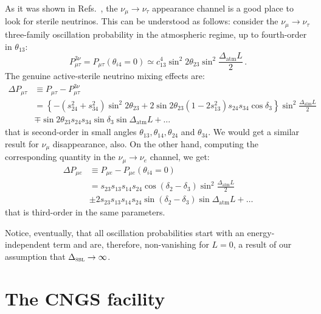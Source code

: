\documentclass[12pt]{elsart}
\newcommand{\Atm}{\text{atm}}
\newcommand{\Sbl}{\textsc{sbl}}
\begin{document}
As it was shown in Refs.~\cite{Donini:2001xy, Donini:2001xp}, the
$\nu_\mu \to \nu_\tau$ appearance channel is a good place to look for
sterile neutrinos. This can be understood as follows: consider the
$\nu_\mu \to \nu_\tau$ three-family oscillation probability in the
atmospheric regime, up to fourth-order in $\theta_{13}$:
%
\begin{equation}
    P^{3\nu}_{\mu\tau} = P_{\mu\tau} (\theta_{i4} = 0)
    \simeq c^4_{13} \sin^2 2 \theta_{23}
    \sin^2 \frac{\Delta_\Atm L}{2} \,.
\end{equation}
%
The genuine active-sterile neutrino mixing effects are:
%
\begin{equation} \begin{split}
    \Delta P_{\mu \tau} &\equiv P_{\mu \tau} - P^{3\nu}_{\mu\tau}
    \\
    &= \left\lbrace - (s^2_{24} + s^2_{34}) \sin^2 2 \theta_{23} 
    + 2 \sin 2 \theta_{23} (1 - 2 s^2_{13}) s_{24} s_{34}
    \cos\delta_3 \right\rbrace \sin^2 \frac{\Delta_\Atm L}{2}
    \\
    &\mp \sin 2 \theta_{23} s_{24} s_{34} \sin\delta_3
    \sin \Delta_\Atm L + \dots
\end{split} \end{equation}
%
that is second-order in small angles $\theta_{13}, \theta_{14},
\theta_{24}$ and $\theta_{34}$. We would get a similar result for
$\nu_\mu$ disappearance, also. On the other hand, computing the
corresponding quantity in the $\nu_\mu \to \nu_e$ channel, we get:
%
\begin{equation} \begin{split}
    \label{eq:dpmue}
    \Delta P_{\mu e} &\equiv P_{\mu e} - P_{\mu e}(\theta_{i4} = 0)
    \\
    &= s_{23} s_{13} s_{14} s_{24} \cos(\delta_2 - \delta_3)
    \sin^2 \frac{\Delta_\Atm L}{2}
    \\
    &\pm 2 s_{23} s_{13} s_{14} s_{24}
    \sin(\delta_2 - \delta_3) \sin \Delta_\Atm L + \dots
\end{split} \end{equation}
%
that is third-order in the same parameters.

Notice, eventually, that all oscillation probabilities start with an
energy-independent term and are, therefore, non-vanishing for $L=0$, a
result of our assumption that $\Delta_\Sbl \to \infty$.  

\section{The CNGS facility}
\label{sec:CNGS}
\end{document}
